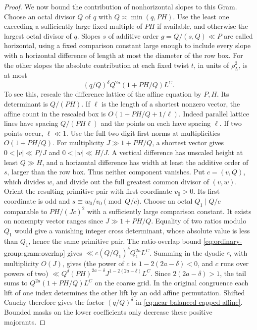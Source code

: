 \documentclass[11pt,a4paper]{article}
\theoremstyle{paperplain}
\numberwithin{equation}{section}
\begin{document}
\begin{proof}
We now bound the contribution of nonhorizontal slopes to this Gram.
Choose an octal divisor $Q$ of $q$ with $Q\asymp\min(q,PH)$.
Use the least one exceeding a sufficiently large fixed multiple
of $PH$ if available, and otherwise the largest octal divisor
of $q$.
Slopes $s$ of additive order $g=Q/(s,Q)\ll P$ are called
horizontal, using a fixed comparison constant large enough
to include every slope with a horizontal difference of length
at most the diameter of the row box. For the other slopes the
absolute contribution at each fixed twist $t$, in units of
$\rho_L^2$, is at most
\begin{equation}\label{eq:near-balanced-capped-affine}
              (q/Q)^\delta Q^{2a}(1+PH/Q)L^C.
\end{equation}
To see this, rescale the difference lattice of the affine
equation by $P,H$. Its determinant is $Q/(PH)$. If $\ell$ is
the length of a shortest nonzero vector, the affine count in
the rescaled box is $O(1+PH/Q+1/\ell)$. Indeed parallel
lattice lines have spacing $Q/(PH\ell)$ and the points on
each have spacing $\ell$. If two points occur, $\ell\ll1$.
Use the full two digit first norms at multiplicities
$O(1+PH/Q)$. For multiplicity $J\gg1+PH/Q$, a shortest
vector gives $0<|v|\ll P/J$ and $0<|w|\ll H/J$. A vertical difference has unscaled height at least $Q\gg H$, and
a horizontal difference has width at least the additive order of $s$,
larger than the row box. Thus neither component vanishes. Put $c=(v,Q)$, which divides $w$, and
divide out the full greatest common divisor of $(v,w)$. Orient
the resulting primitive pair with first coordinate $v_0>0$.
Its first coordinate is odd and $s\equiv w_0/v_0\pmod{Q/c}$.
Choose an octal $Q_1\mid Q/c$ comparable to $PH/(Jc)^2$ with a
sufficiently large comparison constant. It exists on nonempty
vector ranges since $J\gg 1+PH/Q$. Equality of two ratios modulo
$Q_1$ would give a vanishing integer cross determinant, whose
absolute value is less than $Q_1$, hence the same primitive pair.
The ratio-overlap bound \eqref{eq:ordinary-group-gram-overlap} gives
$\ll c (Q/Q_1)^\delta Q_1^{2a}L^C$. Summing in the dyadic $c$,
with multiplicity $O(J)$, gives (the power of $c$ is
$1-2(2a-\delta)<0$, and $c$ runs over powers of two)
$\ll Q^\delta(PH)^{2a-\delta}J^{1-2(2a-\delta)}L^C$.
Since $2(2a-\delta)>1$, the tail sums to
$Q^{2a}(1+PH/Q)L^C$ on the coarse grid. In the original
congruence each lift of one index determines the other lift
by an odd affine permutation. Shifted Cauchy therefore gives
the factor $(q/Q)^\delta$ in \eqref{eq:near-balanced-capped-affine}.
Bounded masks on the
lower coefficients only decrease these positive majorants.


\end{proof}
\end{document}

